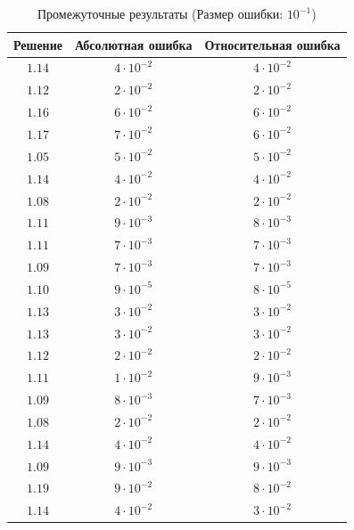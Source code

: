 \begin{table}[h]
   \centering
   \caption{Промежуточные результаты (Размер ошибки: $10^{-1}$)}
   \begin{tabular}{|c|c|c|}
       \hline
       Решение & Абсолютная ошибка & Относительная ошибка \\
       \hline
       $1.14$ & $4 \cdot 10^{-2}$ & $4 \cdot 10^{-2}$ \\
       \hline
       $1.12$ & $2 \cdot 10^{-2}$ & $2 \cdot 10^{-2}$ \\
       \hline
       $1.16$ & $6 \cdot 10^{-2}$ & $6 \cdot 10^{-2}$ \\
       \hline
       $1.17$ & $7 \cdot 10^{-2}$ & $6 \cdot 10^{-2}$ \\
       \hline
       $1.05$ & $5 \cdot 10^{-2}$ & $5 \cdot 10^{-2}$ \\
       \hline
       $1.14$ & $4 \cdot 10^{-2}$ & $4 \cdot 10^{-2}$ \\
       \hline
       $1.08$ & $2 \cdot 10^{-2}$ & $2 \cdot 10^{-2}$ \\
       \hline
       $1.11$ & $9 \cdot 10^{-3}$ & $8 \cdot 10^{-3}$ \\
       \hline
       $1.11$ & $7 \cdot 10^{-3}$ & $7 \cdot 10^{-3}$ \\
       \hline
       $1.09$ & $7 \cdot 10^{-3}$ & $7 \cdot 10^{-3}$ \\
       \hline
       $1.10$ & $9 \cdot 10^{-5}$ & $8 \cdot 10^{-5}$ \\
       \hline
       $1.13$ & $3 \cdot 10^{-2}$ & $3 \cdot 10^{-2}$ \\
       \hline
       $1.13$ & $3 \cdot 10^{-2}$ & $3 \cdot 10^{-2}$ \\
       \hline
       $1.12$ & $2 \cdot 10^{-2}$ & $2 \cdot 10^{-2}$ \\
       \hline
       $1.11$ & $1 \cdot 10^{-2}$ & $9 \cdot 10^{-3}$ \\
       \hline
       $1.09$ & $8 \cdot 10^{-3}$ & $7 \cdot 10^{-3}$ \\
       \hline
       $1.08$ & $2 \cdot 10^{-2}$ & $2 \cdot 10^{-2}$ \\
       \hline
       $1.14$ & $4 \cdot 10^{-2}$ & $4 \cdot 10^{-2}$ \\
       \hline
       $1.09$ & $9 \cdot 10^{-3}$ & $9 \cdot 10^{-3}$ \\
       \hline
       $1.19$ & $9 \cdot 10^{-2}$ & $8 \cdot 10^{-2}$ \\
       \hline
       $1.14$ & $4 \cdot 10^{-2}$ & $3 \cdot 10^{-2}$ \\

\end{tabular}
\end{table}

